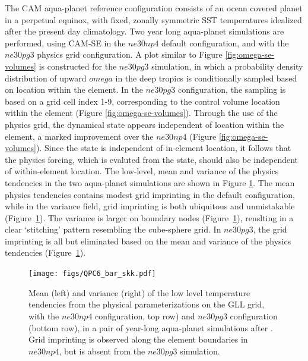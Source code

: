 \documentclass[twocol]{ametsoc}
\begin{document}
The CAM aqua-planet reference configuration \citep{NH2000ASL,MWO2016JAMES} consists of an ocean covered planet in a perpetual equinox, with fixed, zonally symmetric SST temperatures idealized after the present day climatology. Two year long aqua-planet simulations are performed, using CAM-SE in the $ne30np4$ default configuration, and with the $ne30pg3$ physics grid configuration. A plot similar to Figure \ref{fig:omega-se-volumes} is constructed for the $ne30pg3$ simulation, in which a probability density distribution of upward $omega$ in the deep tropics is conditionally sampled based on location within the element. In the $ne30pg3$ configuration, the sampling is based on a grid cell index 1-9, corresponding to the control volume location within the element (Figure \ref{fig:omega-se-volumes}). Through the use of the physics grid, the dynamical state appears independent of location within the element, a marked improvement over the $ne30np4$ (Figure \ref{fig:omega-se-volumes}). Since the state is independent of in-element location, it follows that the physics forcing, which is evaluted from the state, should also be independent of within-element location. The low-level, mean and variance of the physics tendencies in the two aqua-planet simulations are shown in Figure \ref{fig:tendency_imprint}. The mean physics tendencies contains modest grid imprinting in the default configuration, while in the variance field, grid imprinting is both ubiquitous and unmistakable (Figure~\ref{fig:tendency_imprint}). The variance is larger on boundary nodes (Figure~\ref{fig:tendency_imprint}), reuslting in a clear `stitching' pattern resembling the cube-sphere grid. In $ne30pg3$, the grid imprinting is all but eliminated based on the mean and variance of the physics tendencies (Figure~\ref{fig:tendency_imprint}).

\begin{figure}[t]
\noindent\texttt{[image: figs/QPC6\_bar\_skk.pdf]}\\
\caption{Mean (left) and variance (right) of the low level temperature tendencies from the physical parameterizations on the GLL grid, with the $ne30np4$ configuration, top row) and $ne30pg3$ configuration (bottom row), in a pair of year-long aqua-planet simulations after \cite{MWO2016JAMES}. Grid imprinting is observed along the element boundaries in $ne30np4$, but is absent from the $ne30pg3$ simulation.}
\label{fig:tendency_imprint}
\end{figure}
\end{document}
